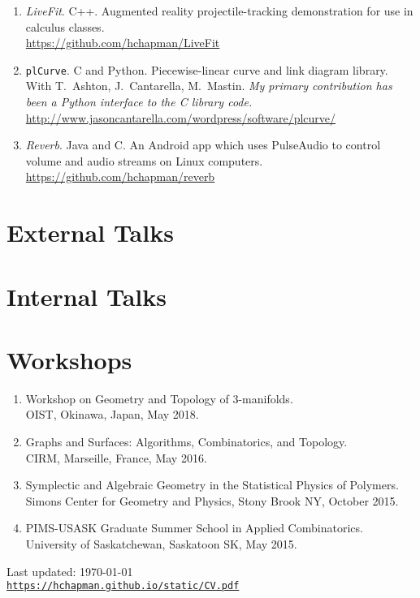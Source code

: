 \documentclass[letterpaper]{article}
\def\footerlink{https://hchapman.github.io/static/CV.pdf}
\begin{document}
\begin{enumerate}
\item \emph{LiveFit}. C++. Augmented reality projectile-tracking demonstration
  for use in calculus classes. \\
  \url{https://github.com/hchapman/LiveFit}
\item \texttt{plCurve}. C and Python. Piecewise-linear curve and link diagram library.\\
  With T.\ Ashton, J.\ Cantarella, M.\ Mastin.
  \textit{My primary contribution has been a Python interface to the C
    library code.} \\
  \url{http://www.jasoncantarella.com/wordpress/software/plcurve/}
\item \emph{Reverb}. Java and C. An Android app which uses PulseAudio to
  control volume and audio streams on Linux computers. \\
  \url{https://github.com/hchapman/reverb}
\end{enumerate}

\section*{External Talks}

\nocite{*}
\printbibliography[heading=none,subtype=external,resetnumbers=true]

\section*{Internal Talks}

\nocite{*}
\printbibliography[heading=none,subtype=internal]

\section*{Workshops}
\begin{enumerate}
\item Workshop on Geometry and Topology of 3-manifolds. \\
  OIST, Okinawa, Japan, May 2018.
\item Graphs and Surfaces: Algorithms, Combinatorics, and Topology. \\
  CIRM, Marseille, France, May 2016.
\item Symplectic and Algebraic Geometry in the Statistical Physics of Polymers. \\
  Simons Center for Geometry and Physics, Stony Brook NY, October 2015. 
\item PIMS-USASK Graduate Summer School in Applied Combinatorics. \\
  University of Saskatchewan, Saskatoon SK, May 2015.
\end{enumerate}

\bigskip

\begin{center}
  \begin{footnotesize}
    Last updated: \today \\
    \href{\footerlink}{\texttt{\footerlink}}
  \end{footnotesize}
\end{center}
\end{document}
